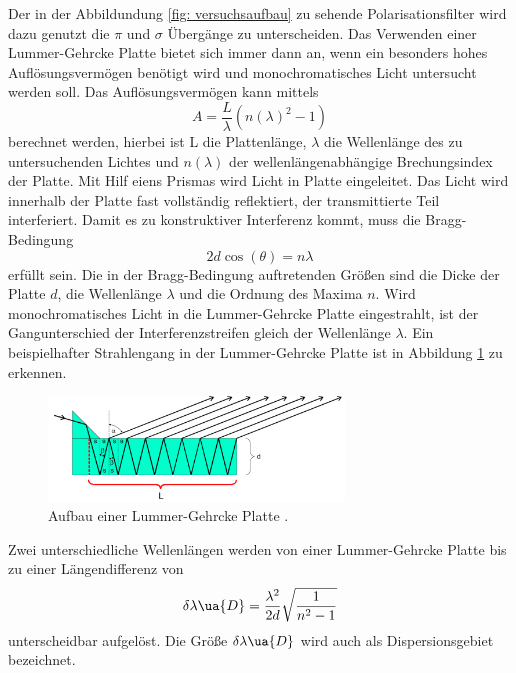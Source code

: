 Der in der Abbildundung \ref{fig: versuchsaufbau} zu sehende Polarisationsfilter wird dazu genutzt
die $\pi$ und $\sigma$ Übergänge zu unterscheiden. Das Verwenden einer Lummer-Gehrcke Platte
bietet sich immer dann an, wenn ein besonders hohes Auflösungsvermögen benötigt wird
und monochromatisches Licht untersucht werden soll.
Das Auflösungsvermögen kann mittels
\begin{equation}
  \label{eq: auflösungsvermoegen_lummer}
  A=\frac{L}{\lambda}(n(\lambda)^2-1)
\end{equation}
berechnet werden, hierbei ist L die Plattenlänge, $\lambda$ die Wellenlänge
des zu untersuchenden Lichtes und $n(\lambda)$ der wellenlängenabhängige
Brechungsindex der Platte. Mit Hilf eiens Prismas wird Licht in Platte eingeleitet.
Das Licht wird innerhalb der Platte fast vollständig reflektiert, der transmittierte
Teil interferiert. Damit es zu konstruktiver Interferenz kommt, muss die Bragg-Bedingung
\begin{equation*}
  2d\cos(\theta)=n\lambda
\end{equation*}
erfüllt sein. Die in der Bragg-Bedingung auftretenden Größen sind die Dicke der Platte $d$,
die Wellenlänge $\lambda$ und die Ordnung des Maxima $n$.
Wird monochromatisches Licht in die Lummer-Gehrcke Platte eingestrahlt, ist der
Gangunterschied der Interferenzstreifen gleich der Wellenlänge $\lambda$.
Ein beispielhafter Strahlengang in der Lummer-Gehrcke Platte ist in Abbildung \ref{fig: lummer} zu erkennen.
\FloatBarrier
\begin{figure}[h]
  \centering
  \includegraphics[width=0.7\textwidth]{pics/lummer.png}
  \caption{Aufbau einer Lummer-Gehrcke Platte \cite{anleitung27}.}
  \label{fig: lummer}
\end{figure}
\FloatBarrier
Zwei unterschiedliche Wellenlängen werden von einer Lummer-Gehrcke Platte bis zu
einer Längendifferenz von
\begin{equation}
  \label{eq: lummer_wellendif}
  \delta \lambda\ua{D}=\frac{\lambda^2}{2 d} \sqrt{\frac{1}{n^2-1}}
\end{equation}
unterscheidbar aufgelöst. Die Größe $\delta \lambda\ua{D}$ wird auch als Dispersionsgebiet
bezeichnet.

